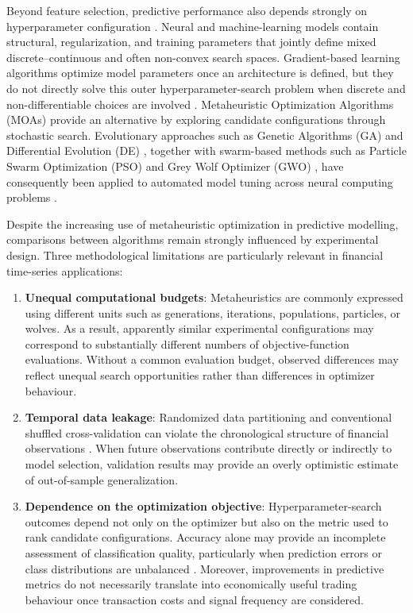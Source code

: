 Beyond feature selection, predictive performance also depends strongly on hyperparameter configuration \cite{jovanovic2024wann}. Neural and machine-learning models contain structural, regularization, and training parameters that jointly define mixed discrete--continuous and often non-convex search spaces. Gradient-based learning algorithms optimize model parameters once an architecture is defined, but they do not directly solve this outer hyperparameter-search problem when discrete and non-differentiable choices are involved \cite{rajwar2023exhaustive_review}. Metaheuristic Optimization Algorithms (MOAs) provide an alternative by exploring candidate configurations through stochastic search. Evolutionary approaches such as Genetic Algorithms (GA) \cite{goldberg1989ga} and Differential Evolution (DE) \cite{storn1997de}, together with swarm-based methods such as Particle Swarm Optimization (PSO) \cite{kennedy1995pso} and Grey Wolf Optimizer (GWO) \cite{faris2018gwo_review}, have consequently been applied to automated model tuning across neural computing problems \cite{al_bannoud2026accelerating, bashir2026evobagnet}.

Despite the increasing use of metaheuristic optimization in predictive modelling, comparisons between algorithms remain strongly influenced by experimental design. Three methodological limitations are particularly relevant in financial time-series applications:

\begin{enumerate}
    \item \textbf{Unequal computational budgets}: Metaheuristics are commonly expressed using different units such as generations, iterations, populations, particles, or wolves. As a result, apparently similar experimental configurations may correspond to substantially different numbers of objective-function evaluations. Without a common evaluation budget, observed differences may reflect unequal search opportunities rather than differences in optimizer behaviour.

    \item \textbf{Temporal data leakage}: Randomized data partitioning and conventional shuffled cross-validation can violate the chronological structure of financial observations \cite{makridakis2018statistical}. When future observations contribute directly or indirectly to model selection, validation results may provide an overly optimistic estimate of out-of-sample generalization.

    \item \textbf{Dependence on the optimization objective}: Hyperparameter-search outcomes depend not only on the optimizer but also on the metric used to rank candidate configurations. Accuracy alone may provide an incomplete assessment of classification quality, particularly when prediction errors or class distributions are unbalanced \cite{chicco2020mcc}. Moreover, improvements in predictive metrics do not necessarily translate into economically useful trading behaviour once transaction costs and signal frequency are considered.
\end{enumerate}


